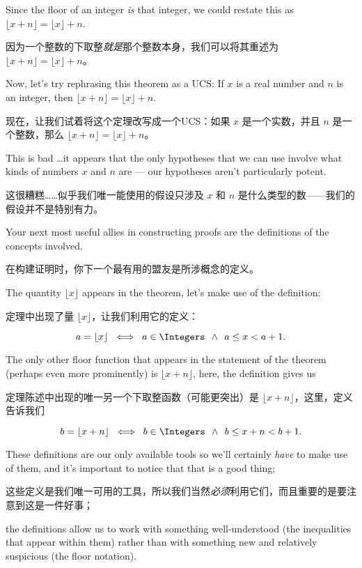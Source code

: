 Since the floor of an integer {\em is} that integer, we could restate this
as $ \lfloor x + n \rfloor = \lfloor x \rfloor +  n$.

因为一个整数的下取整{\em 就是}那个整数本身，我们可以将其重述为 $ \lfloor x + n \rfloor = \lfloor x \rfloor +  n$。

Now, let's try rephrasing this theorem as a UCS:  If $x$ is a real number
and $n$ is an integer, then $\lfloor x + n \rfloor = \lfloor x \rfloor +  n$.

现在，让我们试着将这个定理改写成一个UCS：如果 $x$ 是一个实数，并且 $n$ 是一个整数，那么 $\lfloor x + n \rfloor = \lfloor x \rfloor +  n$。

This is bad \ldots it appears that the only hypotheses that we can use
involve what kinds of numbers $x$ and $n$ are --- our hypotheses aren't
particularly potent.

这很糟糕……似乎我们唯一能使用的假设只涉及 $x$ 和 $n$ 是什么类型的数——我们的假设并不是特别有力。

Your next most useful allies in constructing proofs
are the definitions of the concepts involved.

在构建证明时，你下一个最有用的盟友是所涉概念的定义。

The quantity 
$\lfloor x \rfloor$ appears in the theorem, let's make
use of the definition:

定理中出现了量 $\lfloor x \rfloor$，让我们利用它的定义：

\[ a = \lfloor x  \rfloor \; \iff \; a \in \Integers \; \, 
\land \; \, a \leq x < a+1.
\]

The only other floor function that appears in the statement of the theorem
(perhaps even more prominently) 
is $\lfloor x + n\rfloor$, here, the definition gives us

定理陈述中出现的唯一另一个下取整函数（可能更突出）是 $\lfloor x + n\rfloor$，这里，定义告诉我们
 
\[ b = \lfloor x + n \rfloor \; \iff \; 
b \in \Integers \; \, \land \; \, b \leq x + n < b+1.
\]

These definitions are our only available tools so we'll certainly \emph{have}
to make use of them, and it's important to notice that that is a good thing;

这些定义是我们唯一可用的工具，所以我们当然\emph{必须}利用它们，而且重要的是要注意到这是一件好事；

the definitions allow us to work with something well-understood 
(the inequalities that appear within them) rather than with something 
new and relatively suspicious (the floor notation).

